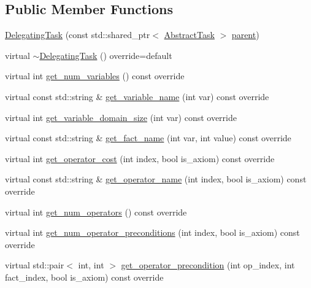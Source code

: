\subsection*{Public Member Functions}
\begin{DoxyCompactItemize}
\item 
\hyperlink{classDelegatingTask_a80da8ef8d04dc5c69ede77d0e2c0601f}{Delegating\-Task} (const std\-::shared\-\_\-ptr$<$ \hyperlink{classAbstractTask}{Abstract\-Task} $>$ \hyperlink{classDelegatingTask_a333f326a36598317987befd345c7836e}{parent})
\item 
virtual \hyperlink{classDelegatingTask_af06a332e2641b91d0de7e17baa00e103}{$\sim$\-Delegating\-Task} () override=default
\item 
virtual int \hyperlink{classDelegatingTask_a1b3289d0d7b5567e38e06350788c1ece}{get\-\_\-num\-\_\-variables} () const override
\item 
virtual const std\-::string \& \hyperlink{classDelegatingTask_a6d0d9b3cfb2eac8f46dbbcbb2284dab3}{get\-\_\-variable\-\_\-name} (int var) const override
\item 
virtual int \hyperlink{classDelegatingTask_a2744ecccb1f245e7d2197e353d79e632}{get\-\_\-variable\-\_\-domain\-\_\-size} (int var) const override
\item 
virtual const std\-::string \& \hyperlink{classDelegatingTask_aff6c956a3c936fcfeac368388e75c385}{get\-\_\-fact\-\_\-name} (int var, int value) const override
\item 
virtual int \hyperlink{classDelegatingTask_a88352a7f751b06d0bd5302388d7ec377}{get\-\_\-operator\-\_\-cost} (int index, bool is\-\_\-axiom) const override
\item 
virtual const std\-::string \& \hyperlink{classDelegatingTask_af0069346a9bf01c82e6ca9f5220f0f1d}{get\-\_\-operator\-\_\-name} (int index, bool is\-\_\-axiom) const override
\item 
virtual int \hyperlink{classDelegatingTask_a17d94e5b76add2569236c252ede36180}{get\-\_\-num\-\_\-operators} () const override
\item 
virtual int \hyperlink{classDelegatingTask_a1b2ae69912faf4c5f58a13bd3f744dec}{get\-\_\-num\-\_\-operator\-\_\-preconditions} (int index, bool is\-\_\-axiom) const override
\item 
virtual std\-::pair$<$ int, int $>$ \hyperlink{classDelegatingTask_a20b4112f42c5cabdb2b578db176b0d1f}{get\-\_\-operator\-\_\-precondition} (int op\-\_\-index, int fact\-\_\-index, bool is\-\_\-axiom) const override
\item 

\end{DoxyCompactItemize}
